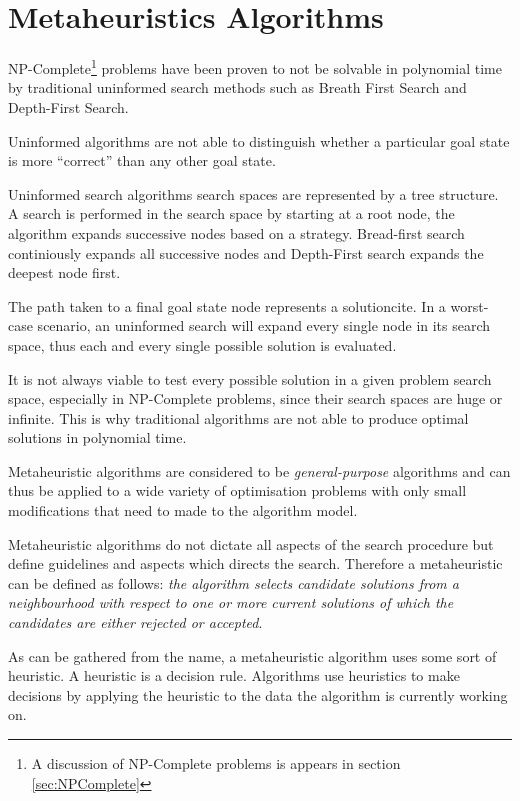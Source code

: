 \section{Metaheuristics Algorithms}
NP-Complete\footnote{A discussion of NP-Complete problems is appears in section \ref{sec:NPComplete}} problems have been proven to not be solvable in polynomial time by traditional uninformed search methods such as Breath First Search and Depth-First Search\cite{AIModernApproach}. 

Uninformed algorithms are not able to distinguish whether a particular goal state is more ``correct'' than any other goal state\cite{AIModernApproach}.

Uninformed search algorithms search spaces are represented by a tree structure\cite{AIModernApproach}. A search is performed in the search space by starting at a root node, the algorithm expands successive nodes based on a strategy\cite{AIModernApproach}. Bread-first search continiously expands all successive nodes and Depth-First search expands the deepest node first\cite{AIModernApproach}.

The path taken to a final  goal state node represents a solutioncite\cite{AIModernApproach}. In a worst-case scenario, an uninformed search will expand every single node in its search space, thus each and every single possible solution is evaluated\cite{AIModernApproach}.

It is not always viable to test every possible solution in a given problem search space, especially in NP-Complete problems, since their search spaces are huge or infinite. This is why traditional algorithms are not able to produce optimal solutions in polynomial time\cite{AIModernApproach}.

Metaheuristic algorithms are considered to be \emph{general-purpose} algorithms and can thus be applied to a wide variety of optimisation problems with only small modifications that need to made to the algorithm model\cite{MetaGraph}.

Metaheuristic algorithms do not dictate all aspects of the search procedure but define guidelines and aspects which directs the search\cite{HandbookofMH}. Therefore a metaheuristic can be defined as follows: \emph{the algorithm selects candidate solutions from a neighbourhood with respect to one or more current solutions of which the candidates are either rejected or accepted}\cite{HandbookofMH}.

As can be gathered from the name, a metaheuristic algorithm uses some sort of heuristic. A heuristic is a decision rule. Algorithms use heuristics to make decisions by applying the heuristic to the data the algorithm is currently working on\cite{AIModernApproach,NatureInspiredMetaHeuristic}.

